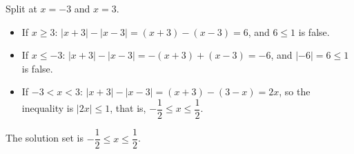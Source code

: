 Split at $x=-3$ and $x=3$.
\begin{itemize}
\item If $x\ge3$: $|x+3|-|x-3|=(x+3)-(x-3)=6$, and $6\le1$ is false.
\item If $x\le-3$: $|x+3|-|x-3|=-(x+3)+(x-3)=-6$, and $|-6|=6\le1$ is false.
\item If $-3<x<3$: $|x+3|-|x-3|=(x+3)-(3-x)=2x$, so the inequality is $|2x|\le1$, that is, $-\dfrac12\le x\le\dfrac12$.
\end{itemize}
The solution set is $\boxed{-\dfrac12\le x\le\dfrac12}$.
